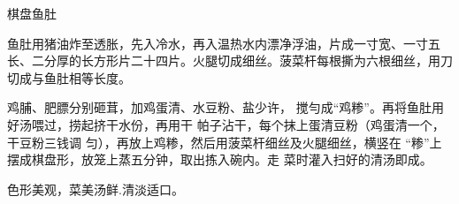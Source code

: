 \begin{recipe}{棋盘鱼肚}

\ingredients


\cooking

\step 鱼肚用猪油炸至透胀，先入冷水，再入温热水内漂净浮油，片成一寸宽、一寸五长、二分厚的长方形片二十四片。火腿切成细丝。菠菜杆每根撕为六根细丝，用刀切成与鱼肚相等长度。

鸡脯、肥膘分别砸茸，加鸡蛋清、水豆粉、盐少许， 搅勻成“鸡糁”。再将鱼肚用好汤喂过，捞起挤干水份，再用干 帕子沾干，每个抹上蛋清豆粉（鸡蛋清一个，干豆粉三钱调 匀），再放上鸡糁，然后用菠菜杆细丝及火腿细丝，横竖在 “糁”上摆成棋盘形，放笼上蒸五分钟，取出拣入碗内。走 菜时灌入扫好的清汤即成。

\notes

色形美观，菜美汤鲜.清淡适口。

\end{recipe}

